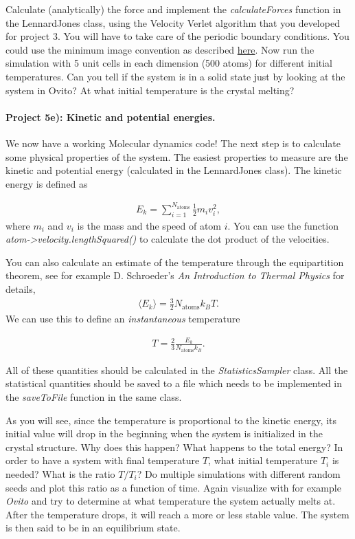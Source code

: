 \documentclass[%
oneside,                 %
final,                   %
10pt]{article}
\begin{document}
Calculate (analytically) the force and implement the \emph{calculateForces} function in the LennardJones class, using the Velocity Verlet algorithm that you developed for project 3. You will have to take care of the periodic boundary conditions. You could use the minimum image convention as described \href{{http://en.wikipedia.org/wiki/Periodic_boundary_conditions}}{here}. Now run the simulation with 5 unit cells in each dimension (500 atoms) for different initial temperatures. Can you tell if the system is in a solid state just by looking at the system in Ovito? At what initial temperature is the crystal melting?

\paragraph{Project 5e): Kinetic and potential energies.}
We now have a working Molecular dynamics code! The next step is to calculate some physical properties of the system. The easiest properties to measure are the kinetic and potential energy (calculated in the LennardJones class). The kinetic energy is defined as

\begin{align}
	E_k = \sum_{i=1}^{N_\text{atoms}} \frac{1}{2} m_i v_i^2,
\end{align}
where $m_i$ and $v_i$ is the mass and the speed of atom $i$. You can use the function \emph{atom->velocity.lengthSquared()} to calculate the dot product of the velocities. 

You can also calculate an estimate of the temperature through the equipartition theorem, see for example D. Schroeder's \emph{An Introduction to Thermal Physics} for details,
\begin{align}
	\langle E_k \rangle = \frac{3}{2}N_\text{atoms} k_B T.
\end{align}
We can use this to define an \emph{instantaneous} temperature

\begin{align}
	T = \frac{2}{3}\frac{E_k}{N_\text{atoms} k_B}.
\end{align}

All of these quantities should be calculated in the \emph{StatisticsSampler} class. All the statistical quantities should be saved to a file which needs to be implemented in the \emph{saveToFile} function in the same class. 

As you will see, since the temperature is proportional to the kinetic energy, its initial value will drop in the beginning when the system is initialized in the crystal structure. Why does this happen? What happens to the total energy? In order to have a system with final temperature $T$, what initial temperature $T_i$ is needed? What is the ratio $T/T_i$? Do multiple simulations with different random seeds and plot this ratio as a function of time. Again visualize with for example \emph{Ovito} and try to determine at what temperature the system actually melts at. After the temperature drops, it will reach a more or less stable value. The system is then said to be in an equilibrium state.
\end{document}
